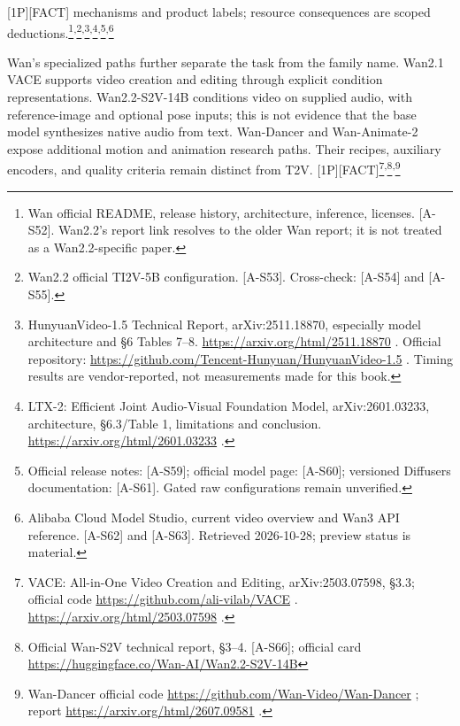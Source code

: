 \mbox{{[}1P{]}}\hspace{0pt}\mbox{{[}FACT{]}} mechanisms and product labels; resource consequences
are scoped
deductions.\footnote{Wan official README, release history, architecture,
  inference, licenses. \mbox{{[}A-S52{]}}. Wan2.2's report link resolves to the
  older Wan report; it is not treated as a Wan2.2-specific paper.}\textsuperscript{,}\footnote{Wan2.2
  official TI2V-5B configuration. \mbox{{[}A-S53{]}}. Cross-check: \mbox{{[}A-S54{]}}
  and \mbox{{[}A-S55{]}}.}\textsuperscript{,}\footnote{HunyuanVideo-1.5
  Technical Report, arXiv:2511.18870, especially model architecture and
  §6 Tables 7--8. \url{https://arxiv.org/html/2511.18870} . Official
  repository: \url{https://github.com/Tencent-Hunyuan/HunyuanVideo-1.5} .
  Timing results are vendor-reported, not measurements made for this
  book.}\textsuperscript{,}\footnote{LTX-2: Efficient Joint Audio-Visual
  Foundation Model, arXiv:2601.03233, architecture, §6.3/Table 1,
  limitations and conclusion. \url{https://arxiv.org/html/2601.03233} .}\textsuperscript{,}\footnote{Official
  release notes: \mbox{{[}A-S59{]}}; official model page: \mbox{{[}A-S60{]}};
  versioned Diffusers documentation: \mbox{{[}A-S61{]}}. Gated raw
  configurations remain unverified.}\textsuperscript{,}\footnote{Alibaba
  Cloud Model Studio, current video overview and Wan3 API reference.
  \mbox{{[}A-S62{]}} and \mbox{{[}A-S63{]}}. Retrieved 2026-10-28; preview status is
  material.}

Wan's specialized paths further separate the task from the family name.
Wan2.1 VACE supports video creation and editing through explicit
condition representations. Wan2.2-S2V-14B conditions video on supplied
audio, with reference-image and optional pose inputs; this is not
evidence that the base model synthesizes native audio from text.
Wan-Dancer and Wan-Animate-2 expose additional motion and animation
research paths. Their recipes, auxiliary encoders, and quality criteria
remain distinct from T2V.
\mbox{{[}1P{]}}\hspace{0pt}\mbox{{[}FACT{]}}\footnote{VACE: All-in-One Video Creation and Editing,
  arXiv:2503.07598, §3.3; official code
  \url{https://github.com/ali-vilab/VACE} . \url{https://arxiv.org/html/2503.07598}
  .}\textsuperscript{,}\footnote{Official Wan-S2V technical report,
  §3--4. \mbox{{[}A-S66{]}}; official card
  \url{https://huggingface.co/Wan-AI/Wan2.2-S2V-14B}}\textsuperscript{,}\footnote{Wan-Dancer
  official code \url{https://github.com/Wan-Video/Wan-Dancer} ; report
  \url{https://arxiv.org/html/2607.09581} .}


